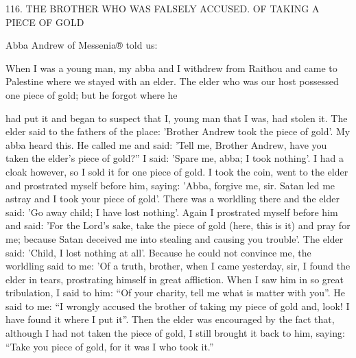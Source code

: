 116. THE BROTHER WHO WAS FALSELY ACCUSED.
OF TAKING A PIECE OF GOLD

Abba Andrew of Messenia® told us:

When I was a young man, my abba and I withdrew from Raithou
and came to Palestine where we stayed with an elder. The elder who
was our host possessed one piece of gold; but he forgot where he

had put it and began to suspect that I, young man that I was, had
stolen it. The elder said to the fathers of the place: 'Brother Andrew
took the piece of gold'. My abba heard this. He called me and said:
'Tell me, Brother Andrew, have you taken the elder's piece of gold?”
I said: 'Spare me, abba; I took nothing'. I had a cloak however, so
I sold it for one piece of gold. I took the coin, went to the elder and
prostrated myself before him, saying: 'Abba, forgive me, sir. Satan
led me astray and I took your piece of gold'. There was a worldling
there and the elder said: 'Go away child; I have lost nothing'. Again
I prostrated myself before him and said: 'For the Lord's sake, take
the piece of gold (here, this is it) and pray for me; because Satan
deceived me into stealing and causing you trouble'. The elder said:
'Child, I lost nothing at all'. Because he could not convince me, the
worldling said to me: 'Of a truth, brother, when I came yesterday,
sir, I found the elder in tears, prostrating himself in great affliction.
When I saw him in so great tribulation, I said to him: “Of your
charity, tell me what is matter with you”. He said to me: “I wrongly
accused the brother of taking my piece of gold and, look! I have
found it where I put it”. Then the elder was encouraged by the fact
that, although I had not taken the piece of gold, I still brought it
back to him, saying: “Take you piece of gold, for it was I who took
it.”

